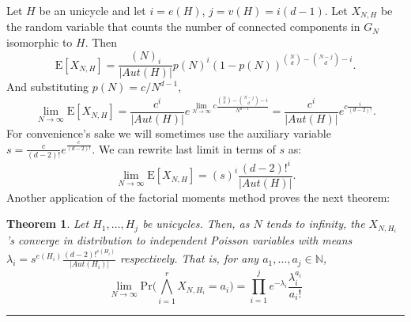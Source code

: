 \documentclass[11pt,notitlepage,a4paper]{article}
\newtheorem{theorem}{Theorem}[section]
\theoremstyle{definition}
\newcommand{\N}{\mathbb{N}}
\newcommand{\LN}{\lim\limits_{N\to \infty}}
\begin{document}
	Let $H$ be an unicycle and let $i=e(H)$, $j=v(H)=i(d-1)$. 
	Let $X_{N,H}$ be the random variable that counts
	the number of connected components in $G_N$ isomorphic to $H$. Then
	\[ 
	\mathrm{E}[X_{N,H}]= \frac{(N)_i}{|Aut(H)|}
	p(N)^{i}(1-p(N))^{\binom{N}{d}-\binom{N-j}{d} - i}.
	\]
	And substituting $p(N)=c/N^{d-1}$,
	\[
	\LN \mathrm{E}[X_{N,H}]=  \frac{c^i}{|Aut(H)|}
	e^{\LN c\frac{\binom{N}{d}-\binom{N-j}{d} - i}{N^{d-1}}}
	=  \frac{c^i}{|Aut(H)|}
	e^{c\frac{i}{(d-2)!}}.
	\]	
	For convenience's sake we will sometimes use the auxiliary variable
	$s=\frac{c}{(d-2)!}e^{\frac{c}{(d-2)!}}$. We can rewrite last 
	limit in terms of $s$ as:
	\[
	\LN \mathrm{E}[X_{N,H}]=(s)^i
	\frac{(d-2)!^i}{|Aut(H)|}.	
	\]
	Another application of the factorial moments method proves the next theorem:

\begin{theorem} \label{thm:probunicycliccomponents}
	Let $H_1,\dots, H_j$ be unicycles. 
	Then, as $N$ tends to infinity, the $X_{N,H_i}$'s converge in 
	distribution to independent Poisson variables with means
	$\lambda_i=s^{e(H_i)}\frac{(d-2)!^{e(H_i)}}{|Aut(H_i)|}$
	respectively. That is, for any $a_1,\dots, a_j\in \N$,
	\[
	\LN \mathrm{Pr}\Big(
	\bigwedge_{i=1}^r
	X_{N,H_i}=a_i		
	\Big)= \prod_{i=1}^{j} e^{-\lambda_i}\frac{\lambda_i^{a_i}}{a_i!}
	\]
\end{theorem} 

\noindent\rule{2cm}{0.4pt}\par
\end{document}
